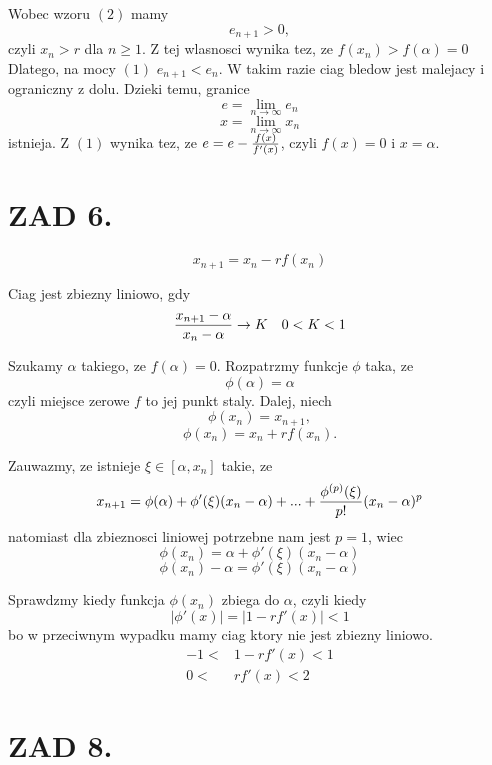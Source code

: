 \documentclass{article}[13pt]
\begin{document}
    Wobec wzoru $(2)$ mamy
    $$e_{n+1}>0,$$ czyli $x_n>r$ dla $n\geq 1$. Z tej wlasnosci wynika tez, ze $f(x_n)>f(\alpha)=0$ Dlatego, na mocy $(1)$ $e_{n+1}<e_n$. W takim razie ciag bledow jest malejacy i ograniczny z dolu. Dzieki temu, granice
    $$e=\lim\limits_{n\to\infty}e_n$$
    $$x=\lim\limits_{n\to\infty}x_n$$
    istnieja. Z $(1)$ wynika tez, ze $e=e-{f(x)\over f'(x)}$, czyli $f(x)=0$ i $x=\alpha$.

    \section*{ZAD 6.}

    $$x_{n+1}=x_n-rf(x_n)$$

    Ciag jest zbiezny liniowo, gdy 
    $${x_{n+1}-\alpha\over x_n-\alpha}\to K\quad 0<K<1$$

    Szukamy $\alpha$ takiego, ze $f(\alpha)=0$. Rozpatrzmy funkcje $\phi$ taka, ze
    $$\phi(\alpha)=\alpha$$
    czyli miejsce zerowe $f$ to jej punkt staly.
    Dalej, niech
    $$\phi(x_n)=x_{n+1},$$
    $$\phi(x_n)=x_n+rf(x_n).$$

    Zauwazmy, ze istnieje $\xi\in[\alpha,x_n]$ takie, ze
    $$x_{n+1}=\phi(\alpha)+\phi'(\xi)(x_n-\alpha)+...+{\phi^{(p)}(\xi)\over p!}(x_n-\alpha)^p$$
    natomiast dla zbieznosci liniowej potrzebne nam jest $p=1$, wiec
    $$\phi(x_n)=\alpha+\phi'(\xi)(x_n-\alpha)$$
    $$\phi(x_n)-\alpha=\phi'(\xi)(x_n-\alpha)$$

    Sprawdzmy kiedy funkcja $\phi(x_n)$ zbiega do $\alpha$, czyli kiedy
    $$|\phi'(x)|=|1-rf'(x)|<1$$
    bo w przeciwnym wypadku mamy ciag ktory nie jest zbiezny liniowo. 
    \begin{align*}
        -1<&1-rf'(x)<1\\
        0<&rf'(x)<2
    \end{align*}
    

    \section*{ZAD 8.}
\end{document}
